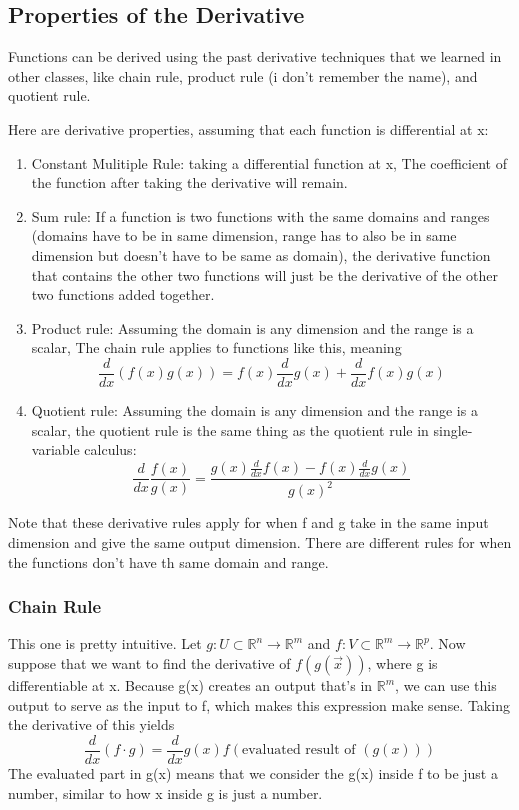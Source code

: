 \documentclass{article}
\begin{document}
\subsection{Properties of the Derivative}
Functions can be derived using the past derivative techniques that we learned in other classes, like chain rule, product rule (i don't remember the name), and quotient rule. \newline

Here are derivative properties, assuming that each function is differential at x:
\begin{enumerate}
  \item Constant Mulitiple Rule: taking a differential function at x, The coefficient of the function after taking the derivative will remain. 
  \item Sum rule: If a function is two functions with the same domains and ranges (domains have to be in same dimension, range has to also be in same dimension but doesn't have to be same as domain),  the derivative function that contains the other two functions will just be the derivative of the other two functions added together.
  \item Product rule: Assuming the domain is any dimension and the range is a scalar, The chain rule applies to functions like this, meaning 
    \[
      \frac{d}{dx} (f(x)g(x)) = f(x)\frac{d}{dx} g(x) + \frac{d}{dx} f(x)g(x)
    \]
  \item Quotient rule: Assuming the domain is any dimension and the range is a scalar, the quotient rule is the same thing as the quotient rule in single-variable calculus:
    \[
      \frac{d}{dx} \frac{f(x)}{g(x)} = \frac{g(x)\frac{d}{dx} f(x) - f(x)\frac{d}{dx}g(x)}{g{(x)}^2}
    \]
\end{enumerate}
Note that these derivative rules apply for when f and g take in the same input dimension and give the same output dimension. There are different rules for when the functions don't have th same domain and range.
\subsubsection{Chain Rule}
This one is pretty intuitive. Let $g: U \subset \mathbb{R}^n \rightarrow \mathbb{R}^m$ and $f: V \subset \mathbb{R}^m \rightarrow \mathbb{R}^p$. Now suppose that we want to find the derivative of $f(g(\vec{x}))$, where g is differentiable at x. Because g(x) creates an output that's in $\mathbb{R}^m$, we can use this output to serve as the input to f, which makes this expression make sense. Taking the derivative of this yields
\[
  \frac{d}{dx} (f \cdot g) = \frac{d}{dx}g(x)f(\text{evaluated result of } (g(x))) 
\]
The evaluated part in g(x) means that we consider the g(x) inside f to be just a number, similar to how x inside g is just a number.
\end{document}

